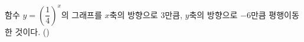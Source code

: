 함수 $y=\left(\dfrac{1}{4}\right)^{x}$의 그래프를 $x$축의 방향으로 $3$만큼, $y$축의 방향으로 $-6$만큼 평행이동한 것이다. \hfill (\hspace*{2.4em})

